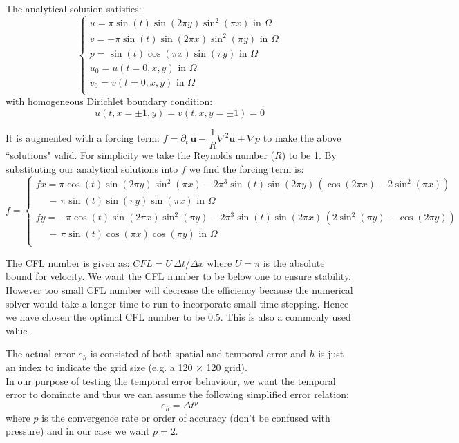 The analytical solution satisfies:
\begin{equation}
\begin{cases}
u = \pi\sin(t)\sin(2\pi y)\sin^2(\pi x) \text{   in $\Omega$} \\
v = - \pi \sin(t)\sin(2\pi x)\sin^2(\pi y) \text{   in $\Omega$} \\
p = \sin(t)\cos(\pi x)\sin(\pi y)  \text{   in $\Omega$}  \\
u_0 = u(t=0,x,y)  \text{   in $\Omega$}  \\
v_0 = v(t=0,x,y)  \text{   in $\Omega$}  \\
\end{cases}
\end{equation}
with homogeneous Dirichlet boundary condition:
\begin{equation*}
u(t, x=\pm 1, y) = v(t, x,y= \pm 1) = 0
\end{equation*}

It is augmented with a forcing term: $f = \partial_t\,\textbf{u} - \dfrac{1}{R}\nabla^2 \textbf{u} + \nabla p$ to make the above ``solutions" valid. For simplicity we take the Reynolds number ($R$) to be 1. By substituting our analytical solutions into $f$ we find the forcing term is:
\begin{equation}
f = 
\begin{cases}
fx = \pi\cos(t)\sin(2\pi y)\sin^2(\pi x) -  2 \pi^3\sin(t)\sin(2\pi y)\,(\cos(2\pi x) - 2\sin^2(\pi x)) \\
\,\,\,\,\,\,\,- \, \pi\sin(t)\sin(\pi y)\sin(\pi x) \text{   in $\Omega$} \\
fy = - \pi\cos(t)\sin(2\pi x)\sin^2(\pi y) - 2\pi^3\sin(t)\sin(2\pi x)\,(2\sin^2(\pi y) - \cos(2\pi y)) \\
\,\,\,\,\,\,\,+ \, \pi\sin(t)\cos(\pi x)\cos(\pi y)  \text{   in $\Omega$}  \\
\end{cases}
\end{equation}

The CFL number is given as: $CFL = U\,\Delta t/\Delta x$ where $U = \pi$ is the absolute bound for velocity. We want the CFL number to be below one to ensure stability. However too small CFL number will decrease the efficiency because the numerical solver would take a longer time to run to incorporate small time stepping. Hence we have chosen the optimal CFL number to be 0.5. This is also a commonly used value \cite{brown2001accurate}.

The actual error $e_h$ is consisted of both spatial and temporal error and $h$ is just an index to indicate the grid size (e.g. a 120 $\times$ 120 grid).\\
In our purpose of testing the temporal error behaviour, we want the temporal error to dominate and thus we can assume the following simplified error relation:
\begin{equation}
e_h = \Delta t^p
\end{equation}
where $p$ is the convergence rate or order of accuracy (don't be confused with pressure) and in our case we want $p=2$.\\

